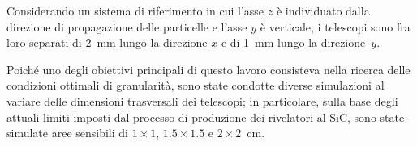 Considerando un sistema di riferimento in cui l'asse $z$ è individuato dalla direzione di propagazione delle particelle e l'asse $y$ è verticale, i telescopi sono fra loro separati di 2~mm lungo la direzione $x$ e di 1~mm lungo la direzione~$y$.


%




Poiché uno degli obiettivi principali di questo lavoro consisteva nella ricerca delle condizioni ottimali di granularità, sono state condotte diverse simulazioni al variare delle dimensioni trasversali dei telescopi; in particolare, sulla base degli attuali limiti imposti dal processo di produzione dei rivelatori al SiC, sono state simulate aree sensibili di $1 \times 1$, $1.5 \times 1.5$ e $2 \times 2$~cm.






